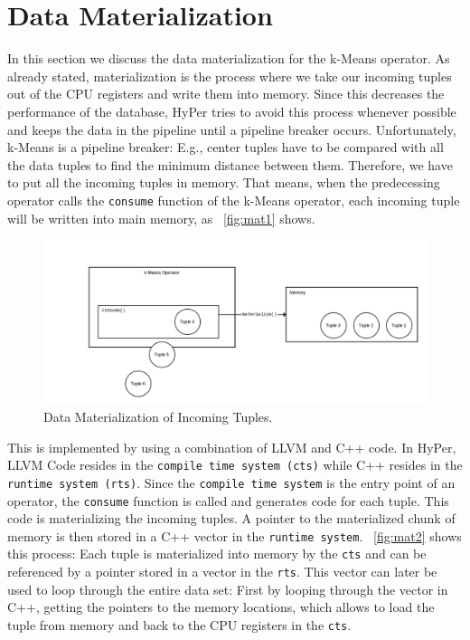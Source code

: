 \section{Data Materialization}

In this section we discuss the data materialization for the k-Means operator. As already stated, materialization is the process where we take our incoming tuples out of the CPU registers and write them into memory. Since this decreases the performance of the database, HyPer tries to avoid this process whenever possible and keeps the data in the pipeline until a pipeline breaker occurs. Unfortunately, k-Means is a pipeline breaker: E.g., center tuples have to be compared with all the data tuples to find the minimum distance between them. Therefore, we have to put all the incoming tuples in memory. That means, when the predecessing operator calls the \texttt{consume} function of the k-Means operator, each incoming tuple will be written into main memory, as ~\autoref{fig:mat1} shows. 

\begin{figure}[htsb]
  \centering
  \includegraphics[scale=0.4]{figures/mat1}
  \caption[Data Materialization of Incoming Tuples]{Data Materialization of Incoming Tuples.}
  \label{fig:mat1}
\end{figure}

This is implemented by using a combination of LLVM and C++ code. In HyPer, LLVM Code resides in the \texttt{compile time system (cts)} while C++ resides in the \texttt{runtime system (rts)}. Since the \texttt{compile time system} is the entry point of an operator, the \texttt{consume} function is called and generates code for each tuple. This code is materializing the incoming tuples. A pointer to the materialized chunk of memory is then stored in a C++ vector in the \texttt{runtime system}. ~\autoref{fig:mat2} shows this process: Each tuple is materialized into memory by the \texttt{cts} and can be referenced by a pointer stored in a vector in the \texttt{rts}. This vector can later be used to loop through the entire data set: First by looping through the vector in C++, getting the pointers to the memory locations, which allows to load the tuple from memory and back to the CPU registers in the \texttt{cts}. 


